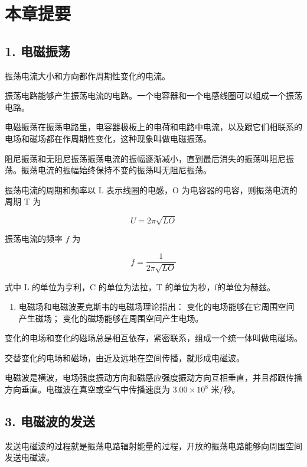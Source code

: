 \section{本章提要}\label{ux672cux7ae0ux63d0ux8981-6}

\subsection{1. 电磁振荡}\label{ux7535ux78c1ux632fux8361}

振荡电流大小和方向都作周期性变化的电流。

振荡电路能够产生振荡电流的电路。一个电容器和一个电感线圈可以组成一个振荡电路。

电磁振荡在振荡电路里，电容器极板上的电荷和电路中电流，以及跟它们相联系的电场和磁场都在作周期性变化，这种现象叫做电磁振荡。

阻尼振荡和无阻尼振荡振荡电流的振幅逐渐减小，直到最后消失的振荡叫阻尼振荡。振荡电流的振幅始终保持不变的振荡叫无阻尼振荡。

振荡电流的周期和频率以 L 表示线圈的电感，O
为电容器的电容，则振荡电流的周期 T 为

\[
U = 2 \pi \sqrt{L O}
\]

振荡电流的频率 \(f\) 为

\[
f = \frac{1}{2 \pi \sqrt{L O}}
\]

式中 L 的单位为亨利，C 的单位为法拉，T 的单位为秒，f的单位为赫兹。

\begin{enumerate}
\def\labelenumi{\arabic{enumi}.}
\setcounter{enumi}{1}
\tightlist
\item
  电磁场和电磁波麦克斯韦的电磁场理论指出：
  变化的电场能够在它周围空间产生磁场；
  变化的磁场能够在周围空间产生电场。
\end{enumerate}

变化的电场和变化的磁场总是相互依存，紧密联系，组成一个统一体叫做电磁场。

交替变化的电场和磁场，由近及远地在空间传播，就形成电磁波。

电磁波是横波，电场强度振动方向和磁感应强度振动方向互相垂直，并且都跟传播方向垂直。电磁波在真空或空气中传播速度为
\(3.00 \times 10^{8}\) 米/秒。

\subsection{3.
电磁波的发送}\label{ux7535ux78c1ux6ce2ux7684ux53d1ux9001-2}

发送电磁波的过程就是振荡电路辐射能量的过程，开放的振荡电路能够向周围空间发送电磁波。


